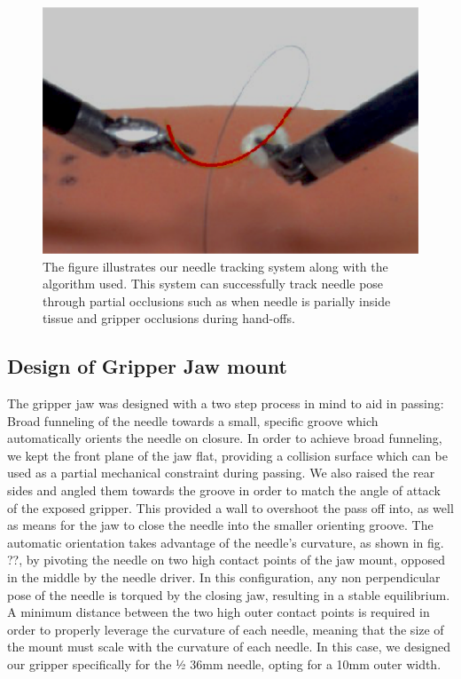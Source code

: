 \documentclass[0-suturing.tex]{subfiles}
\begin{document}
\begin{figure}[!t]
\centering
\includegraphics[width=0.9\linewidth]{figures/needleTrack}
\caption{The figure illustrates our needle tracking system along with the algorithm used. This system can successfully track needle pose through partial occlusions such as when needle is parially inside tissue and gripper occlusions during hand-offs.}
\label{fig:tracking}
\vspace{-10pt}
\end{figure}


\subsection{Design of Gripper Jaw mount}

The gripper jaw was designed with a two step process in mind to aid in passing: Broad funneling of the needle towards a small, specific groove which automatically orients the needle on closure.
	In order to achieve broad funneling, we kept the front plane of the jaw flat, providing a collision surface which can be used as a partial mechanical constraint during passing. We also raised the rear sides and angled them towards the groove in order to match the angle of attack of the exposed gripper. This provided a wall to overshoot the pass off into, as well as means for the jaw to close the needle into the smaller orienting groove. 
	The automatic orientation takes advantage of the needle’s curvature, as shown in fig. ??, by pivoting the needle on two high contact points of the jaw mount, opposed in the middle by the needle driver. In this configuration, any non perpendicular pose of the needle is torqued by the closing jaw, resulting in a stable equilibrium. A minimum distance between the two high outer contact points is required in order to properly leverage the curvature of each needle, meaning that the size of the mount must scale with the curvature of each needle. In this case, we designed our gripper specifically for the ½ 36mm needle, opting for a 10mm outer width.
\end{document}

